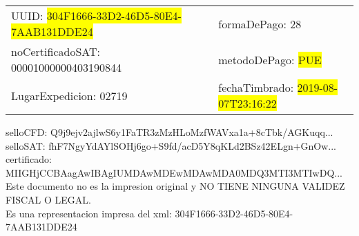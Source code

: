 \documentclass{article}
\begin{document}
\begin{tabular}{p{11cm}p{1cm}p{8cm}}
\bigskip
UUID: \colorbox{yellow}{ 304F1666-33D2-46D5-80E4-7AAB131DDE24 } & & formaDePago: 28\\

noCertificadoSAT: 00001000000403190844 & & metodoDePago: \colorbox{yellow}{ PUE }\\

LugarExpedicion: 02719 & & fechaTimbrado: \colorbox{yellow}{ 2019-08-07T23:16:22 } \\
\end{tabular}

\bigskip
selloCFD: Q9j9ejv2ajlwS6y1FaTR3zMzHLoMzfWAVxa1a+8cTbk/AGKuqq... \\
selloSAT: fhF7NgyYdAYlSOHj6go+S9fd/acD5Y8qKLd2BSz42ELgn+GnOw... \\

certificado: MIIGHjCCBAagAwIBAgIUMDAwMDEwMDAwMDA0MDQ3MTI3MTIwDQ...\bigskip\bigskip\bigskip\bigskip\bigskip\bigskip
\\Este documento no es la impresion original y NO TIENE NINGUNA VALIDEZ FISCAL O LEGAL. \\
 Es una representacion impresa del xml:  304F1666-33D2-46D5-80E4-7AAB131DDE24 \\
\end{document}
